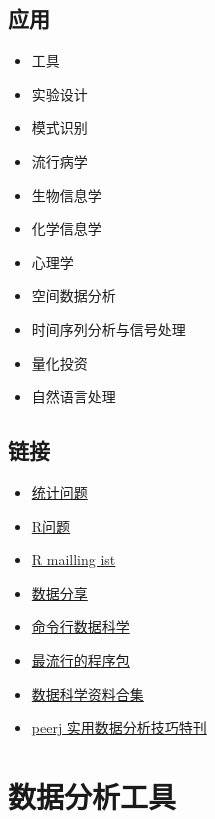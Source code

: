 \documentclass[
]{book}
\providecommand{\tightlist}{%
  \setlength{\itemsep}{0pt}\setlength{\parskip}{0pt}}
\begin{document}
\hypertarget{ux5e94ux7528}{%
\section{应用}\label{ux5e94ux7528}}

\begin{itemize}
\tightlist
\item
  工具
\item
  实验设计
\item
  模式识别
\item
  流行病学
\item
  生物信息学
\item
  化学信息学
\item
  心理学
\item
  空间数据分析
\item
  时间序列分析与信号处理
\item
  量化投资
\item
  自然语言处理
\end{itemize}

\hypertarget{ux94feux63a5}{%
\section{链接}\label{ux94feux63a5}}

\begin{itemize}
\tightlist
\item
  \href{https://stats.stackexchange.com/}{统计问题}
\item
  \href{http://stackoverflow.com/}{R问题}
\item
  \href{http://www.r-project.org/mail.html}{R mailling ist}
\item
  \href{http://figshare.com/}{数据分享}
\item
  \href{https://www.datascienceatthecommandline.com}{命令行数据科学}
\item
  \href{https://github.com/kaxap/arl}{最流行的程序包}
\item
  \href{https://github.com/bulutyazilim/awesome-datascience}{数据科学资料合集}
\item
  \href{https://peerj.com/collections/50-practicaldatascistats/}{peerj 实用数据分析技巧特刊}
\end{itemize}

\hypertarget{tool}{%
\chapter{数据分析工具}\label{tool}}
\end{document}
